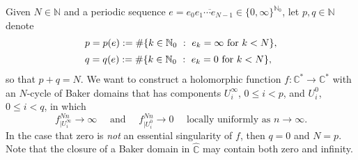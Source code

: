 \documentclass[a4paper, 12pt, reqno]{amsart}
\numberwithin{equation}{section}
\newcommand{\ds}{\displaystyle}
\theoremstyle{plain}
\theoremstyle{definition}
\theoremstyle{remark}
\newcommand{\C}{{\mathbb{C}}}
\newcommand{\CR}{{\hat{\mathbb{C}}}}
\newcommand{\N}{{\mathbb{N}}}
\renewcommand{\Im}{\operatorname{Im}}
\begin{document}


Given $N\in\N$ and a periodic sequence \mbox{$e=\overline{e_0e_1\cdots e_{N-1}}\in\{0,\infty\}^{\N_0}$}, let $p,q\in\N$ denote
\begin{equation}
\begin{array}{l}
p=p(e):=\#\{k\in\N_0\ :\ e_k=\infty \mbox{ for } k<N\},\vspace{5pt}\\
q=q(e):=\#\{k\in\N_0\ :\ e_k=0 \mbox{ for } k<N\},
\end{array}
\label{eq:p-and-q}
\end{equation}
so that $p+q=N$. We want to construct a holomorphic function \mbox{$f:\C^*\to\C^*$} with an $N$-cycle of Baker domains that has components $U_i^\infty$, $0\leqslant i<p$, and $U_i^0$, $0\leqslant i<q$, in which 
$$
f_{|U_i^\infty}^{Nn}\to\infty\quad \mbox{ and } \quad f_{|U_i^0}^{Nn}\to 0 \quad \mbox{ locally uniformly as } n\to \infty.
$$
In the case that zero is \textit{not} an essential singularity of $f$, then $q=0 $ and $N=p$. Note that the closure of a Baker domain in $\CR$ may contain both zero and infinity. 
\end{document}
